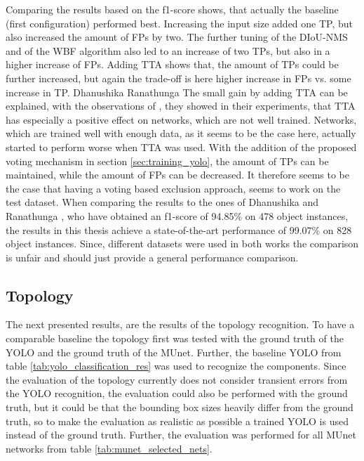 Comparing the results based on the f1-score shows, that actually the baseline (first configuration) performed best.
Increasing the input size added one \ac{TP}, but also increased the amount of \acp{FP} by two.
The further tuning of the \ac{DIoU}-\ac{NMS} and of the \ac{WBF} algorithm also led to an increase of two \acp{TP}, but also in a higher increase of \acp{FP}.
Adding \ac{TTA} shows that, the amount of \acp{TP} could be further increased, but again the trade-off is here higher increase in \acp{FP} vs. some increase in \ac{TP}.
Dhanushika
Ranathunga
The small gain by adding \ac{TTA} can be explained, with the observations of \cite{when_tta_works}, they showed in their experiments, that \ac{TTA} has especially a positive effect on networks, which are not well trained.
Networks, which are trained well with enough data, as it seems to be the case here, actually started to perform worse when \ac{TTA} was used.
With the addition of the proposed voting mechanism in section \ref{sec:training_yolo}, the amount of \acp{TP} can be maintained, while the amount of \acp{FP} can be decreased.
It therefore seems to be the case that having a voting based exclusion approach, seems to work on the test dataset.
When comparing the results to the ones of Dhanushika and Ranathunga \cite{ecd_yolobool}, who have obtained an f1-score of 94.85\% on 478 object instances, the results in this thesis achieve a state-of-the-art performance of 99.07\% on 828 object instances.
Since, different datasets were used in both works the comparison is unfair and should just provide a general performance comparison.

\subsection{Topology}

The next presented results, are the results of the topology recognition.
To have a comparable baseline the topology first was tested with the ground truth of the \ac{YOLO} and the ground truth of the \ac{MUnet}.
Further, the baseline \ac{YOLO} from table \ref{tab:yolo_classification_res} was used to recognize the components.
Since the evaluation of the topology currently does not consider transient errors from the \ac{YOLO} recognition, the evaluation could also be performed with the ground truth, but it could be that the bounding box sizes heavily differ from the ground truth, so to make the evaluation as realistic as possible a trained \ac{YOLO} is used instead of the ground truth.
Further, the evaluation was performed for all \ac{MUnet} networks from table \ref{tab:munet_selected_nets}.

